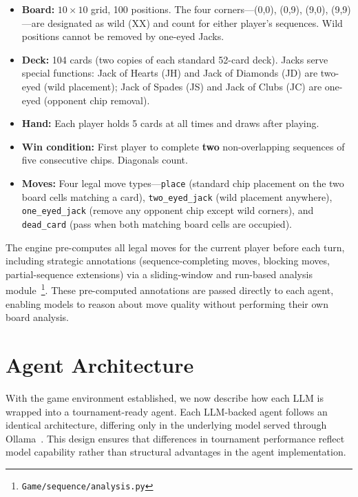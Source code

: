 \documentclass[11pt]{article}
\begin{document}
\begin{itemize}[nosep]
\item \textbf{Board:} $10 \times 10$ grid, 100 positions. The four corners---(0,0), (0,9), (9,0), (9,9)---are designated as wild (XX) and count for either player's sequences. Wild positions cannot be removed by one-eyed Jacks.
\item \textbf{Deck:} 104 cards (two copies of each standard 52-card deck). Jacks serve special functions: Jack of Hearts (JH) and Jack of Diamonds (JD) are two-eyed (wild placement); Jack of Spades (JS) and Jack of Clubs (JC) are one-eyed (opponent chip removal).
\item \textbf{Hand:} Each player holds 5 cards at all times and draws after playing.
\item \textbf{Win condition:} First player to complete \textbf{two} non-overlapping sequences of five consecutive chips. Diagonals count.
\item \textbf{Moves:} Four legal move types---\texttt{place} (standard chip placement on the two board cells matching a card), \texttt{two\_eyed\_jack} (wild placement anywhere), \texttt{one\_eyed\_jack} (remove any opponent chip except wild corners), and \texttt{dead\_card} (pass when both matching board cells are occupied).
\end{itemize}

The engine pre-computes all legal moves for the current player before each turn, including strategic annotations (sequence-completing moves, blocking moves, partial-sequence extensions) via a sliding-window and run-based analysis module~\footnote{\texttt{Game/sequence/analysis.py}}. These pre-computed annotations are passed directly to each agent, enabling models to reason about move quality without performing their own board analysis.

\section{Agent Architecture}
\label{sec:arch}

With the game environment established, we now describe how each LLM is wrapped into a tournament-ready agent. Each LLM-backed agent follows an identical architecture, differing only in the underlying model served through Ollama~\cite{ollama}. This design ensures that differences in tournament performance reflect model capability rather than structural advantages in the agent implementation.
\end{document}
